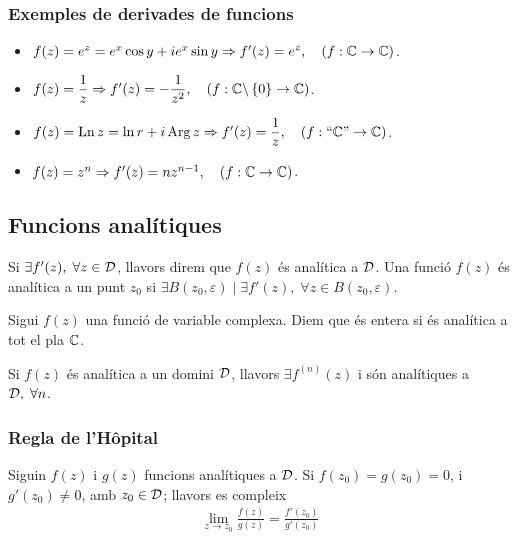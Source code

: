 \subsubsection*{Exemples de derivades de funcions}
\begin{itemize}
    \item $f(z) = e^{z} = e^{x} \cos y + i e^{x} \sin y \Rightarrow f'(z) = e^{z}, \quad (f: \mathbb{C} \to \mathbb{C})$.
    \item $f(z) = \dfrac{1}{z} \Rightarrow f'(z) = -\dfrac{1}{z^{2}}, \quad (f: \mathbb{C}\backslash \left\{ 0 \right\} \to \mathbb{C})$.
    \item $f(z) = \operatorname{Ln} z = \ln r + i \operatorname{Arg} z \Rightarrow f'(z) = \dfrac{1}{z}, \quad (f: \text{“}\mathbb{C}\text{”} \to \mathbb{C})$.
    \item $f(z) = z^{n} \Rightarrow f'(z) = n z^{n-1}, \quad (f: \mathbb{C} \to \mathbb{C})$.
\end{itemize}
\subsection{Funcions analítiques}
\begin{defi}
    Si $\exists f'(z), \; \forall z \in \mathcal{D}$, llavors direm que $f(z)$ és analítica a $\mathcal{D}$. Una funció $f(z)$ és analítica a un punt $z_{0}$ si $\exists B(z_{0}, \varepsilon) \mid \exists f'(z), \; \forall z \in B(z_{0}, \varepsilon)$.
\end{defi}
\begin{defi}
    Sigui $f(z)$ una funció de variable complexa. Diem que és entera si és analítica a tot el pla $\mathbb{C}$.
\end{defi}

\begin{thm}\label{thm:exists-pder-cont}
    Si $f(z)$ és analítica a un domini $\mathcal{D}$, llavors $\exists f^{(n)}(z)$ i són analítiques a $\mathcal{D}, \; \forall n$.
\end{thm}

\subsubsection*{Regla de l'Hôpital}
Siguin $f(z)$ i $g(z)$ funcions analítiques a $\mathcal{D}$. Si $f(z_{0}) = g(z_{0}) = 0$, i $g'(z_{0}) \neq 0$, amb $z_{0} \in \mathcal{D}$; llavors es compleix
\begin{align}
    \lim_{z \to z_{0}} \frac{f(z)}{g(z)} = \frac{f'(z_{0})}{g'(z_{0})}
\end{align}

